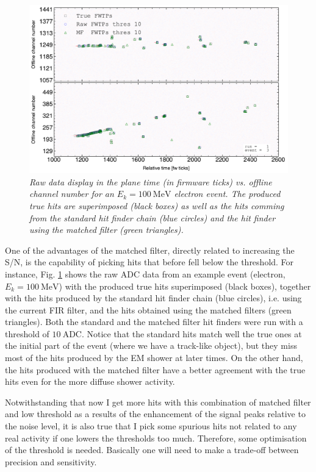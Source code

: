 \begin{figure}
	\centering
	\includegraphics[width=0.9\linewidth]{Images/Matched_Filter/electron_k100_full_run_1_evt_3}
	\caption{\textit{Raw data display in the plane time (in firmware ticks) vs. offline channel number for an $E_{k} = 100 \ \mathrm{MeV}$ electron event. The produced true hits are superimposed (black boxes) as well as the hits comming from the standard hit finder chain (blue circles) and the hit finder using the matched filter (green triangles).}}
	\label{fig:evthitcomp}
\end{figure}

One of the advantages of the matched filter, directly related to increasing the S/N, is the capability of picking hits that before fell below the threshold. For instance, Fig. \ref{fig:evthitcomp} shows the raw ADC data from an example event (electron, $E_{k} = 100 \ \mathrm{MeV}$) with the produced true hits superimposed (black boxes), together with the hits produced by the standard hit finder chain (blue circles), i.e. using the current FIR filter, and the hits obtained using the matched filters (green triangles). Both the standard and the matched filter hit finders were run with a threshold of $10 \ \mathrm{ADC}$. Notice that the standard hits match well the true ones at the initial part of the event (where we have a track-like object), but they miss most of the hits produced by the EM shower at later times. On the other hand, the hits produced with the matched filter have a better agreement with the true hits even for the more diffuse shower activity.

Notwithstanding that now I get more hits with this combination of matched filter and low threshold as a results of the enhancement of the signal peaks relative to the noise level, it is also true that I pick some spurious hits not related to any real activity if one lowers the thresholds too much. Therefore, some optimisation of the threshold is needed. Basically one will need to make a trade-off between precision and sensitivity.

